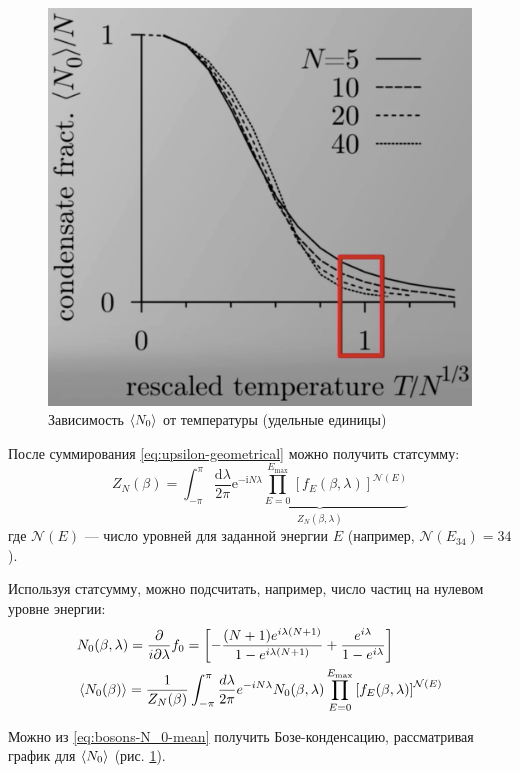 \begin{figure}
    \label{fig:N_0-T-plot}
    \includegraphics[width=\linewidth]{fig/N_0-T-plot}
    \caption{Зависимость $\braket{N_0}$ от температуры (удельные единицы)}
\end{figure}

После суммирования \eqref{eq:upsilon-geometrical} можно получить статсумму:
\begin{equation}
    \label{eq:bosons-partition-function}
    Z_{N}(\beta)=\int_{-\pi}^{\pi} \frac{\mathrm{d} \lambda}{2 \pi} \underbrace{\mathrm{e}^{-\mathrm{i} N \lambda} \prod_{E=0}^{E_{\max }}\left[f_{E}(\beta, \lambda)\right]^{\mathcal{N}(E)}}_{Z_{N}(\beta, \lambda)}
\end{equation}
где $\mathcal{N}(E)$ --- число уровней для заданной энергии $E$ (например, $\mathcal{N} (E_{34}) = 34$).

Используя статсумму, можно подсчитать, например, число частиц на нулевом уровне энергии:
\begin{align}
    \label{eq:bosons-N_0-mean}
    & N_{0}(\beta, \lambda)=\frac{\partial}{i \partial \lambda} f_{0}=\left[-\frac{(N+1) e^{i \lambda(N+1)}}{1-e^{i \lambda(N+1)}}+\frac{e^{i \lambda}}{1-e^{i \lambda}}\right] \\
    & \braket{N_{0}(\beta)}=\frac{1}{Z_{N}(\beta)} \int_{-\pi}^{\pi} \frac{d \lambda}{2 \pi} e^{-i N \lambda} N_{0}(\beta, \lambda) \prod_{E=0}^{E_{\max }}\left[f_{E}(\beta, \lambda)\right]^{\mathcal{N}(E)}
\end{align}

Можно из \eqref{eq:bosons-N_0-mean} получить Бозе-конденсацию, рассматривая график для $\braket{N_0}$ (рис. \ref{fig:N_0-T-plot}).
